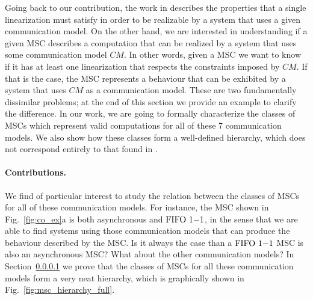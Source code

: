 

Going back to our contribution, the work in \cite{DBLP:journals/fac/ChevrouHQ16} describes the properties that a single linearization must satisfy in order to be realizable by a system that uses a given communication model. On the other hand, we are interested in understanding if a given MSC describes a computation that can be realized by a system that uses some communication model $CM$. In other words, given a MSC we want to know if it has at least one linearization that respects the constraints imposed by $CM$. If that is the case, the MSC represents a behaviour that can be exhibited by a system that uses $CM$ as a communication model. These are two fundamentally dissimilar problems; at the end of this section we provide an example to clarify the difference. In our work, we are going to formally characterize the classes of MSCs which represent valid computations for all of these 7 communication models. We also show how these classes form a well-defined hierarchy, which does not correspond entirely to that found in \cite{DBLP:journals/fac/ChevrouHQ16}.


\paragraph{Contributions.}

We find of particular interest to study the relation between the classes of MSCs for all of these communication models. For instance, the MSC shown in Fig.~\ref{fig:co_ex}a is both asynchronous and $\text{FIFO } 1\mathsf{-}1$, in the sense that we are able to find systems using those communication models that can produce the behaviour described by the MSC. Is it always the case than a $\text{FIFO } 1\mathsf{-}1$ MSC is also an asynchronous MSC? What about the other communication models? In Section~\ref{} we prove that the classes of MSCs for all these communication models form a very neat hierarchy, which is graphically shown in Fig.~\ref{fig:msc_hierarchy_full}.


